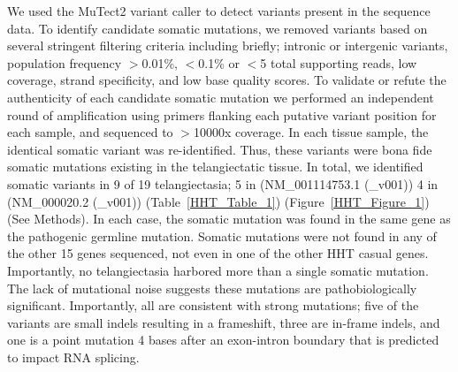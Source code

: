 We used the MuTect2 variant caller to detect variants present in the sequence data. To identify candidate somatic mutations, we removed variants based on several stringent filtering criteria including briefly; intronic or intergenic variants, population frequency $>$0.01\%, $<$0.1\% or $<$5 total supporting reads, low coverage, strand specificity, and low base quality scores. 
To validate or refute the authenticity of each candidate somatic mutation we performed an independent round of amplification using primers flanking each putative variant position for each sample, and sequenced to $>$10000x coverage.   In each tissue sample, the identical somatic variant was re-identified.  Thus, these variants were bona fide somatic mutations existing in the telangiectatic tissue. In total, we identified somatic variants in 9 of 19 telangiectasia; 5 in (NM\_001114753.1 (\_v001)) 4 in (NM\_000020.2 (\_v001)) (Table~\ref{HHT_Table_1}) (Figure~\ref{HHT_Figure_1}) (See Methods). In each case, the somatic mutation was found in the same gene as the pathogenic germline mutation.   Somatic mutations were not found in any of the other 15 genes sequenced, not even in one of the other HHT casual genes.  Importantly, no telangiectasia harbored more than a single somatic mutation. The lack of mutational noise suggests these mutations are pathobiologically significant.  Importantly, all are consistent with strong mutations; five of the variants are small indels resulting in a frameshift, three are in-frame indels, and one is a point mutation 4 bases after an exon-intron boundary that is predicted to impact RNA splicing.

